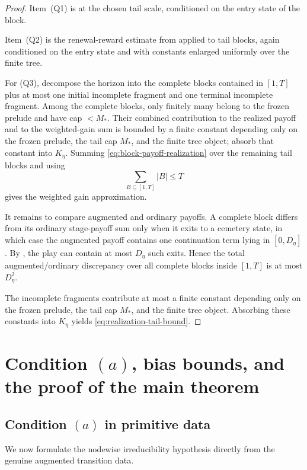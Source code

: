 \documentclass[12pt]{article}
\theoremstyle{definition}
\newcommand{\1}{\mathbf{1}}
\begin{document}
\begin{proof}
Item~(Q1) is  at the chosen tail scale, conditioned on
the entry state of the block.

Item~(Q2) is the renewal-reward estimate from 
applied to tail blocks, again conditioned on the entry state and with constants
enlarged uniformly over the finite tree.

For (Q3), decompose the horizon into the complete blocks contained in $[1,T]$ plus
at most one initial incomplete fragment and one terminal incomplete fragment.
Among the complete blocks, only finitely many belong to the frozen prelude and
have cap $<M_*$. Their combined contribution to the realized payoff and to the
weighted-gain sum is bounded by a finite constant depending only on the frozen
prelude, the tail cap $M_*$, and the finite tree object; absorb that constant
into $K_\eta$. Summing
\eqref{eq:block-payoff-realization} over the remaining tail blocks and using
\[
\sum_{B\subseteq [1,T]} |B|\le T
\]
gives the weighted gain approximation.

It remains to compare augmented and ordinary payoffs. A complete block differs
from its ordinary stage-payoff sum only when it exits to a cemetery state, in
which case the augmented payoff contains one continuation term lying in
$[0,D_\eta]$. By , the play can contain at most $D_\eta$
such exits. Hence the total augmented/ordinary discrepancy over all complete
blocks inside $[1,T]$ is at most $D_\eta^2$.

The incomplete fragments contribute at most a finite constant depending only on the
frozen prelude, the tail cap $M_*$, and the finite tree object. Absorbing these
constants into $K_\eta$ yields \eqref{eq:realization-tail-bound}.
\end{proof}

\section{Condition \texorpdfstring{$(a)$}{(a)}, bias bounds, and the proof of the main theorem}
\label{sec:proof-main}

\subsection{Condition \texorpdfstring{$(a)$}{(a)} in primitive data}

We now formulate the nodewise irreducibility hypothesis directly from the genuine
augmented transition data.
\end{document}
